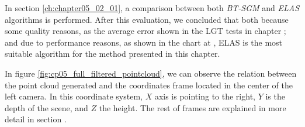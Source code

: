 In section \ref{ch:chapter05_02_01}, a comparison between both \emph{BT-SGM} and \emph{ELAS} algorithms is performed. After this evaluation, we concluded that both because some quality reasons, as the average error shown in the \ac{LGT} tests in chapter ; and due to performance reasons, as shown in the chart at , ELAS is the most suitable algorithm for the method presented in this chapter.

In figure \ref{fig:cp05_full_filtered_pointcloud}, we can observe the relation between the point cloud generated and the coordinates frame located in the center of the left camera. In this coordinate system, $X$ axis is pointing to the right, $Y$ is the depth of the scene, and $Z$ the height. The rest of frames are explained in more detail in section .

